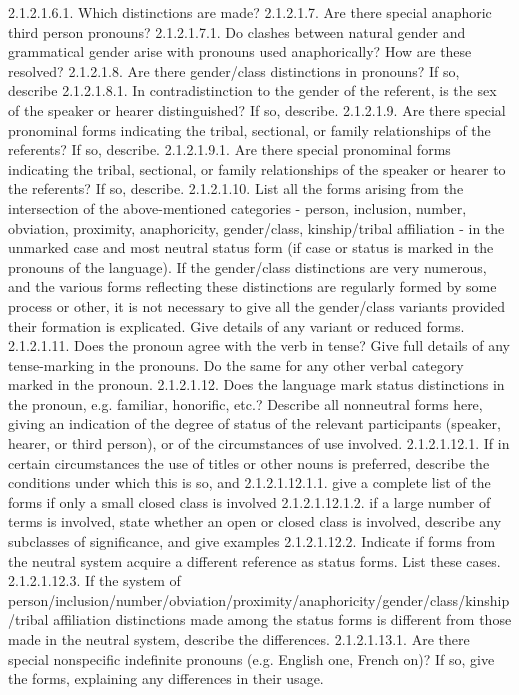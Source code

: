 2.1.2.1.6.1. Which distinctions are made?
2.1.2.1.7. Are there special anaphoric third person pronouns?
2.1.2.1.7.1. Do clashes between natural gender and grammatical gender arise with pronouns used anaphorically? How are these resolved?
2.1.2.1.8. Are there gender/class distinctions in pronouns? If so, describe
2.1.2.1.8.1. In contradistinction to the gender of the referent, is the sex of the speaker or hearer distinguished? If so, describe.
2.1.2.1.9. Are there special pronominal forms indicating the tribal, sectional, or family relationships of the referents? If so, describe.
2.1.2.1.9.1. Are there special pronominal forms indicating the tribal, sectional, or family relationships of the speaker or hearer to the referents? If so, describe.
2.1.2.1.10. List all the forms arising from the intersection of the above-mentioned categories - person, inclusion, number, obviation, proximity, anaphoricity, gender/class, kinship/tribal affiliation - in the unmarked case and most neutral status form (if case or status is marked in the pronouns of the language). If the gender/class distinctions are very numerous, and the various forms reflecting these distinctions are regularly formed by some process or other, it is not necessary to give all the gender/class variants provided their formation is explicated. Give details of any variant or reduced forms.
2.1.2.1.11. Does the pronoun agree with the verb in tense? Give full details of any tense-marking in the pronouns. Do the same for any other verbal category marked in the pronoun.
2.1.2.1.12. Does the language mark status distinctions in the pronoun, e.g. familiar, honorific, etc.? Describe all nonneutral forms here, giving an indication of the degree of status of the relevant participants (speaker, hearer, or third person), or of the circumstances of use involved.
2.1.2.1.12.1. If in certain circumstances the use of titles or other nouns is preferred, describe the conditions under which this is so, and
2.1.2.1.12.1.1. give a complete list of the forms if only a small closed class is involved
2.1.2.1.12.1.2. if a large number of terms is involved, state whether an open or closed class is involved, describe any subclasses of significance, and give examples
2.1.2.1.12.2. Indicate if forms from the neutral system acquire a different reference as status forms. List these cases.
2.1.2.1.12.3. If the system of person/inclusion/number/obviation/proximity/anaphoricity/gender/class/kinship/tribal affiliation distinctions made among the status forms is different from those made in the neutral system, describe the differences.
2.1.2.1.13.1. Are there special nonspecific indefinite pronouns (e.g. English one, French on)? If so, give the forms, explaining any differences in their usage.
